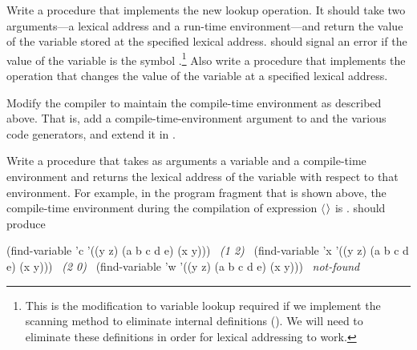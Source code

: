 \begin{exerciseGroup}
\label{Exercise 5.39}
 Write a procedure
 that implements the new lookup operation.  It
should take two arguments---a lexical address and a run-time environment---and
return the value of the variable stored at the specified lexical address.
 should signal an error if the value of the
variable is the symbol .\footnote{This is the modification
to variable lookup required if we implement the scanning method to eliminate
internal definitions ().  We will need to eliminate these
definitions in order for lexical addressing to work.} Also write a procedure
 that implements the operation that changes the
value of the variable at a specified lexical address.

\label{Exercise 5.40}
 Modify the compiler to maintain
the compile-time environment as described above.  That is, add a
compile-time-environment argument to  and the various code
generators, and extend it in .

\label{Exercise 5.41}
 Write a procedure
 that takes as arguments a variable and a compile-time
environment and returns the lexical address of the variable with respect to
that environment.  For example, in the program fragment that is shown above,
the compile-time environment during the compilation of expression \( \langle \)\( \kern0.08em\rangle \) is
.   should produce

\begin{codeBlock}
(find-variable 'c '((y z) (a b c d e) (x y)))
~\textit{(1 2)}~
(find-variable 'x '((y z) (a b c d e) (x y)))
~\textit{(2 0)}~
(find-variable 'w '((y z) (a b c d e) (x y)))
~\textit{not-found}~
\end{codeBlock}


\end{exerciseGroup}
